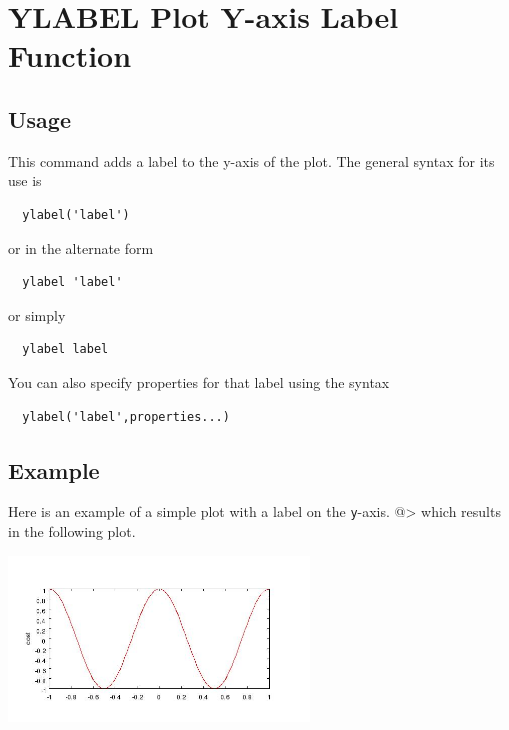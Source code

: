 \section{YLABEL Plot Y-axis Label Function}

\subsection{Usage}

This command adds a label to the y-axis of the plot.  The general syntax
for its use is
\begin{verbatim}
  ylabel('label')
\end{verbatim}
or in the alternate form
\begin{verbatim}
  ylabel 'label'
\end{verbatim}
or simply
\begin{verbatim}
  ylabel label
\end{verbatim}
You can also specify properties for that label using the syntax
\begin{verbatim}
  ylabel('label',properties...) 
\end{verbatim}
\subsection{Example}

Here is an example of a simple plot with a label on the \verb|y|-axis.
@>
which results in the following plot.


\centerline{\includegraphics[width=8cm]{ylabel1}}


